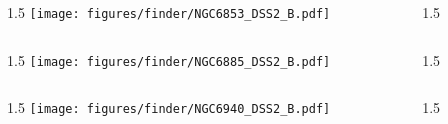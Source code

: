 \documentclass[final]{beamer}
\newlength{\colwidth}
\begin{document}
\begin{frame}[t]{}
  \begin{columns}[T]
    \begin{column}{1.5\colwidth}
      \centering
      \texttt{[image: figures/finder/NGC6853\_DSS2\_B.pdf]}
    \end{column}
    \begin{column}{1.5\colwidth}
      \Large
      
    \end{column}
  \end{columns}
  \vspace{\fill}
  \begin{columns}[T]
    \begin{column}{1.5\colwidth}
      \centering
      \texttt{[image: figures/finder/NGC6885\_DSS2\_B.pdf]}
    \end{column}
    \begin{column}{1.5\colwidth}
      \Large
      
    \end{column}
  \end{columns}
\end{frame}

\begin{frame}[t]{}
  \begin{columns}[T]
    \begin{column}{1.5\colwidth}
      \centering
      \texttt{[image: figures/finder/NGC6940\_DSS2\_B.pdf]}
    \end{column}
    \begin{column}{1.5\colwidth}
      \Large
      
    \end{column}
  \end{columns}
  \vspace{\fill}
\end{frame}
\end{document}
